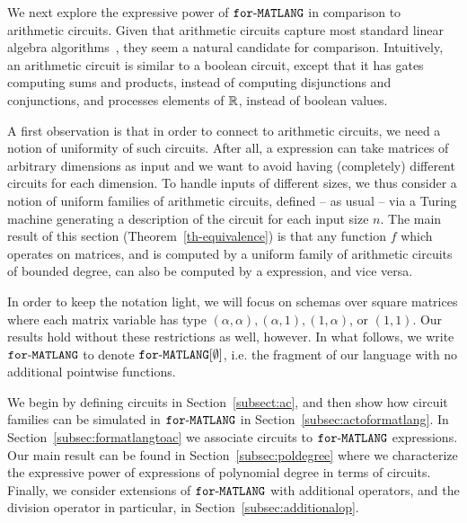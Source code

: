 We next explore the expressive power of $\texttt{for}\text{-}\texttt{MATLANG}$ in comparison to arithmetic circuits.
Given that arithmetic circuits capture most standard linear algebra algorithms~\cite{Raz02,ShpilkaY10},
they seem a natural candidate for comparison. 
%
Intuitively, an arithmetic circuit is similar to a boolean circuit,
except that it has gates computing sums and products, 
instead of computing disjunctions and conjunctions, and processes elements of $\mathbb{R}$, 
instead of boolean values. 


A first observation is that in order to connect \langfor to arithmetic circuits, we need a 
notion of uniformity of such circuits. After all, a \langfor expression can take matrices 
of arbitrary dimensions as input and we want to avoid having (completely) different circuits
for each dimension.
%
To handle inputs of different sizes, we thus consider a notion of uniform families of arithmetic
circuits, defined -- as usual -- via a Turing machine generating a description of the circuit for 
each input size $n$.
%
The main result of this section (Theorem~\ref{th-equivalence}) is that any function $f$ which operates on matrices, and is computed 
by a uniform family of arithmetic circuits of bounded degree, can also be computed by 
a \langfor expression, and vice versa.

In order to keep the notation light, we will focus on \langfor schemas over square matrices where 
each matrix variable has type $(\alpha,\alpha),(\alpha,1),(1,\alpha)$, or $(1,1)$.
Our results hold without these restrictions as well, however. 
%
In what follows, we write $\texttt{for}\text{-}\texttt{MATLANG}$ to denote $\texttt{for}\text{-}\texttt{MATLANG}[\emptyset]$, i.e. the fragment of 
our language with no additional pointwise functions. 
%

We begin by defining circuits in Section~\ref{subsect:ac}, and then show how circuit families can be
simulated in $\texttt{for}\text{-}\texttt{MATLANG}$ in Section~\ref{subsec:actoformatlang}. In Section~\ref{subsec:formatlangtoac} 
we associate circuits to $\texttt{for}\text{-}\texttt{MATLANG}$ expressions. Our main result can be found in Section~\ref{subsec:poldegree}
where we characterize the expressive power of \langfor expressions of polynomial degree in terms of circuits.
Finally, we consider extensions of $\texttt{for}\text{-}\texttt{MATLANG}$ with additional
operators, and the division operator in particular, in Section~\ref{subsec:additionalop}.

